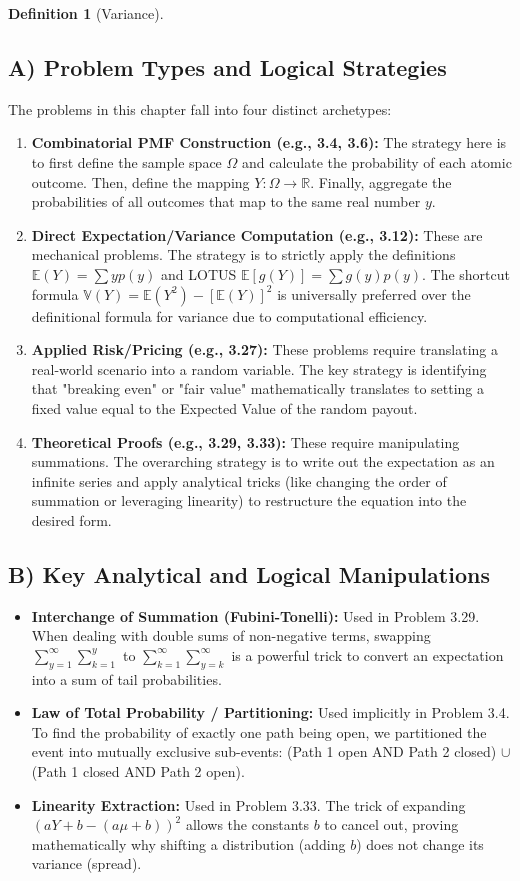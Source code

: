 \documentclass[11pt,letterpaper]{article}
\theoremstyle{definition}
\newtheorem{definition}{Definition}[section]
\theoremstyle{plain}
\theoremstyle{remark}
\newcommand{\E}{\mathbb{E}}
\newcommand{\V}{\mathbb{V}}
\newcommand{\R}{\mathbb{R}}
\begin{document}
\begin{definition}[Variance]
\subsection{A) Problem Types and Logical Strategies}
The problems in this chapter fall into four distinct archetypes:
\begin{enumerate}
    \item \textbf{Combinatorial PMF Construction (e.g., 3.4, 3.6):} The strategy here is to first define the sample space $\Omega$ and calculate the probability of each atomic outcome. Then, define the mapping $Y: \Omega \to \R$. Finally, aggregate the probabilities of all outcomes that map to the same real number $y$.
    \item \textbf{Direct Expectation/Variance Computation (e.g., 3.12):} These are mechanical problems. The strategy is to strictly apply the definitions $\E(Y) = \sum y p(y)$ and LOTUS $\E[g(Y)] = \sum g(y) p(y)$. The shortcut formula $\V(Y) = \E(Y^2) - [\E(Y)]^2$ is universally preferred over the definitional formula for variance due to computational efficiency.
    \item \textbf{Applied Risk/Pricing (e.g., 3.27):} These problems require translating a real-world scenario into a random variable. The key strategy is identifying that "breaking even" or "fair value" mathematically translates to setting a fixed value equal to the Expected Value of the random payout.
    \item \textbf{Theoretical Proofs (e.g., 3.29, 3.33):} These require manipulating summations. The overarching strategy is to write out the expectation as an infinite series and apply analytical tricks (like changing the order of summation or leveraging linearity) to restructure the equation into the desired form.
\end{enumerate}

\subsection{B) Key Analytical and Logical Manipulations}
\begin{itemize}
    \item \textbf{Interchange of Summation (Fubini-Tonelli):} Used in Problem 3.29. When dealing with double sums of non-negative terms, swapping $\sum_{y=1}^\infty \sum_{k=1}^y$ to $\sum_{k=1}^\infty \sum_{y=k}^\infty$ is a powerful trick to convert an expectation into a sum of tail probabilities.
    \item \textbf{Law of Total Probability / Partitioning:} Used implicitly in Problem 3.4. To find the probability of exactly one path being open, we partitioned the event into mutually exclusive sub-events: (Path 1 open AND Path 2 closed) $\cup$ (Path 1 closed AND Path 2 open).
    \item \textbf{Linearity Extraction:} Used in Problem 3.33. The trick of expanding $(aY+b - (a\mu+b))^2$ allows the constants $b$ to cancel out, proving mathematically why shifting a distribution (adding $b$) does not change its variance (spread).
\end{itemize}


\end{definition}
\end{document}
